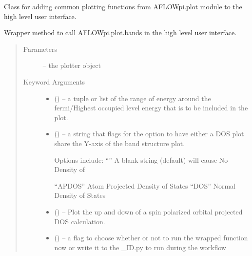 \documentclass[letterpaper,10pt,english]{sphinxmanual}
\begin{document}
\begin{fulllineitems}
\label{\detokenize{prep:prep.plotter}}
Class for adding common plotting functions from AFLOWpi.plot module to the high level user
interface.

\begin{fulllineitems}
\label{\detokenize{prep:prep.plotter.bands}}
Wrapper method to call AFLOWpi.plot.bands in the high level user interface.
\begin{quote}\begin{description}
\item[{Parameters}] \leavevmode
{} -- the plotter object

\item[{Keyword Arguments}] \leavevmode\begin{itemize}
\item {} 
 () -- a tuple or list of the range of energy around the fermi/Highest
occupied level energy that is to be included in the plot.

\item {} 
 () -- 
a string that flags for the option to have either a DOS plot
share the Y-axis of the band structure plot.

Options include:
``''      \textbar{} A blank string (default) will cause No Density of
\begin{quote}

\end{quote}

``APDOS'' \textbar{} Atom Projected Density of States
``DOS''   \textbar{} Normal Density of States


\item {} 
 () -- Plot the up and down of a spin polarized orbital projected DOS
calculation.

\item {} 
 () -- a flag to choose whether or not to run the wrapped function now
or write it to the \_ID.py to run during the workflow


\end{itemize}
\end{description}
\end{quote}
\end{fulllineitems}
\end{fulllineitems}
\end{document}
